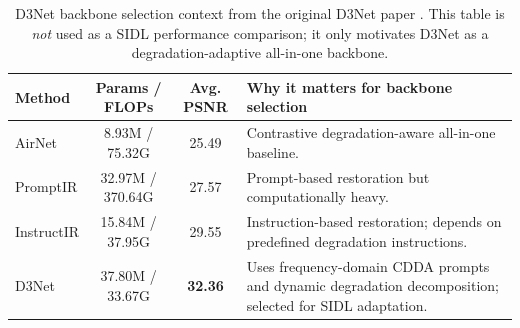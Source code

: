 \begin{table}[t]
\centering
\caption{D3Net backbone selection context from the original D3Net paper \cite{wang2025d3net}. This table is \emph{not} used as a SIDL performance comparison; it only motivates D3Net as a degradation-adaptive all-in-one backbone.}
\label{tab:allinone_context}
\small
\begin{tabularx}{\linewidth}{l c c X}
\toprule
Method & Params / FLOPs & Avg. PSNR & Why it matters for backbone selection \\
\midrule
AirNet & 8.93M / 75.32G & 25.49 & Contrastive degradation-aware all-in-one baseline. \\
PromptIR & 32.97M / 370.64G & 27.57 & Prompt-based restoration but computationally heavy. \\
InstructIR & 15.84M / 37.95G & 29.55 & Instruction-based restoration; depends on predefined degradation instructions. \\
D3Net & 37.80M / 33.67G & \textbf{32.36} & Uses frequency-domain CDDA prompts and dynamic degradation decomposition; selected for SIDL adaptation. \\
\bottomrule
\end{tabularx}
\end{table}

